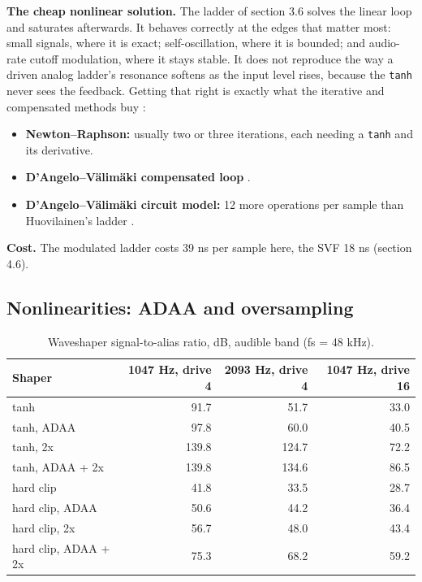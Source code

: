 \documentclass[conference]{IEEEtran}
\begin{document}
\textbf{The cheap nonlinear solution.} The ladder of section 3.6 solves the linear loop and saturates afterwards. It behaves correctly at the edges that matter most: small signals, where it is exact; self-oscillation, where it is bounded; and audio-rate cutoff modulation, where it stays stable. It does not reproduce the way a driven analog ladder's resonance softens as the input level rises, because the \texttt{tanh} never sees the feedback. Getting that right is exactly what the iterative and compensated methods buy \cite{r7,r12,r42}:

\begin{itemize}
\item \textbf{Newton–Raphson:} usually two or three iterations, each needing a \texttt{tanh} and its derivative.
\item \textbf{D'Angelo–Välimäki compensated loop} \cite{r7}.
\item \textbf{D'Angelo–Välimäki circuit model:} 12 more operations per sample than Huovilainen's ladder \cite{r5}.
\end{itemize}

\textbf{Cost.} The modulated ladder costs 39 ns per sample here, the SVF 18 ns (section 4.6).

\setcounter{subsection}{4}
\subsection{Nonlinearities: ADAA and oversampling}
\begin{table}[t]
\centering\footnotesize
\caption{Waveshaper signal-to-alias ratio, dB, audible band (fs = 48 kHz).}
\begin{tabularx}{\textwidth}{@{}>{\raggedright\arraybackslash}Xrrr@{}}
\toprule
\textbf{Shaper} & \textbf{1047 Hz, drive 4} & \textbf{2093 Hz, drive 4} & \textbf{1047 Hz, drive 16} \\
\midrule
tanh & 91.7 & 51.7 & 33.0 \\
tanh, ADAA & 97.8 & 60.0 & 40.5 \\
tanh, 2x & 139.8 & 124.7 & 72.2 \\
tanh, ADAA + 2x & 139.8 & 134.6 & 86.5 \\
hard clip & 41.8 & 33.5 & 28.7 \\
hard clip, ADAA & 50.6 & 44.2 & 36.4 \\
hard clip, 2x & 56.7 & 48.0 & 43.4 \\
hard clip, ADAA + 2x & 75.3 & 68.2 & 59.2 \\
\bottomrule
\end{tabularx}
\end{table}
\end{document}
